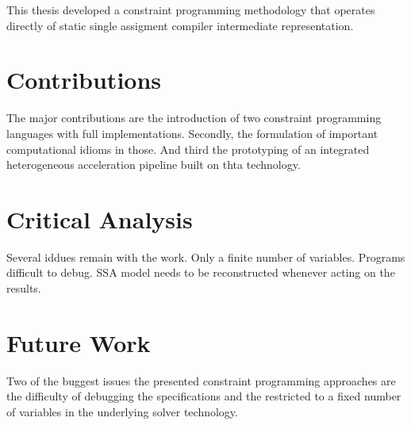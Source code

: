 
    This thesis developed a constraint programming methodology that operates
    directly of static single assigment compiler intermediate representation.

\section{Contributions}

    The major contributions are the introduction of two constraint programming
    languages with full implementations.
    Secondly, the formulation of important computational idioms in those.
    And third the prototyping of an integrated heterogeneous acceleration
    pipeline built on thta technology.

\section{Critical Analysis}

    Several iddues remain with the work.
    Only a finite number of variables.
    Programs difficult to debug.
    SSA model needs to be reconstructed whenever acting on the results.

\section{Future Work}

    Two of the buggest issues the presented constraint programming approaches
    are the difficulty of debugging the specifications and the restricted to a
    fixed number of variables in the underlying solver technology.